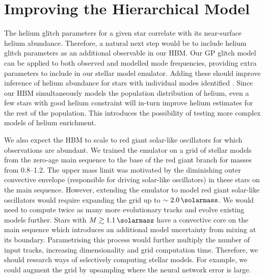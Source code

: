 
\section*{Improving the Hierarchical Model}

The helium glitch parameters for a given star correlate with its near-surface helium abundance. Therefore, a natural next step would be to include helium glitch parameters as an additional observable in our HBM. Our GP glitch model can be applied to both observed and modelled mode frequencies, providing extra parameters to include in our stellar model emulator. Adding these should improve inference of helium abundance for stars with individual modes identified \citep[e.g.][]{Davies.SilvaAguirre.ea2016,Lund.SilvaAguirre.ea2017}. Since our HBM simultaneously models the population distribution of helium, even a few stars with good helium constraint will in-turn improve helium estimates for the rest of the population. This introduces the possibility of testing more complex models of helium enrichment.

We also expect the HBM to scale to red giant solar-like oscillators for which observations are abundant. We trained the emulator on a grid of stellar models from the zero-age main sequence to the base of the red giant branch for masses from \SIrange{0.8}{1.2}{\solarmass}. The upper mass limit was motivated by the diminishing outer convective envelope (responsible for driving solar-like oscillators) in these stars on the main sequence. However, extending the emulator to model red giant solar-like oscillators would require expanding the grid up to \(\sim\SI{2.0}{\solarmass}\). We would need to compute twice as many more evolutionary tracks and evolve existing models further. Stars with \(M \gtrsim \SI{1.1}{\solarmass}\) have a convective core on the main sequence which introduces an additional model uncertainty from mixing at its boundary. Parametrising this process would further multiply the number of input tracks, increasing dimensionality and grid computation time. Therefore, we should research ways of selectively computing stellar models. For example, we could augment the grid \citep[e.g.][]{Li.Davies.ea2022} by upsampling where the neural network error is large.

